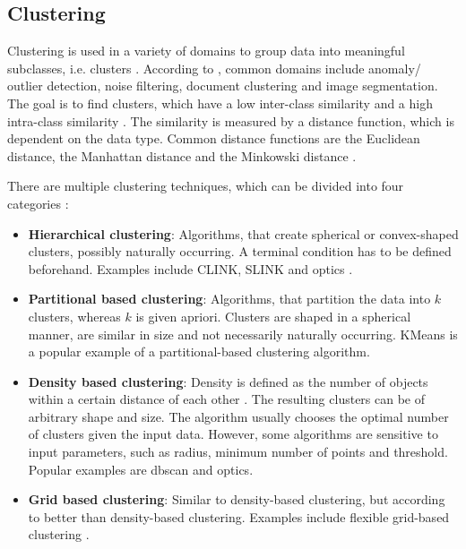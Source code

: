 \subsection{Clustering}\label{subsec:clustering}

Clustering is used in a variety of domains to group data into meaningful subclasses, i.e. clusters \cite{OPTICS2013, OPTICS2014, OPTICS_kMeans_2016}.
According to \citeauthor{OPTICS2013}, common domains include anomaly/ outlier detection, noise filtering, document clustering and image segmentation. 
The goal is to find clusters, which have a low inter-class similarity and a high intra-class similarity \cite{OPTICS2013}.
The similarity is measured by a distance function, which is dependent on the data type. 
Common distance functions are the Euclidean distance, the Manhattan distance and the Minkowski distance \cite{OPTICS_kMeans_2016}.

There are multiple clustering techniques, which can be divided into four categories \cite{OPTICS2016}: 
\begin{itemize}
    \item \textbf{Hierarchical clustering}:
    Algorithms, that create spherical or convex-shaped clusters, possibly naturally occurring. 
    A terminal condition has to be defined beforehand.
    Examples include CLINK, SLINK \cite{OPTICS2014} and \ac{optics} \cite{OPTICS2013}.

    \item \textbf{Partitional based clustering}: 
    Algorithms, that partition the data into $k$ clusters, whereas $k$ is given apriori.
    Clusters are shaped in a spherical manner, are similar in size and not necessarily naturally occurring.
    KMeans is a popular example of a partitional-based clustering algorithm.

    \item \textbf{Density based clustering}:
    Density is defined as the number of objects within a certain distance of each other \cite{OPTICS_kMeans_2016}.
    The resulting clusters can be of arbitrary shape and size.
    The algorithm usually chooses the optimal number of clusters given the input data.
    However, some algorithms are sensitive to input parameters, such as radius, minimum number of points and threshold.
    Popular examples are \ac{dbscan} and \ac{optics}.
    
    \item \textbf{Grid based clustering}:
    Similar to density-based clustering, but according to \citeauthor{OPTICS2016} better than density-based clustering.
    Examples include flexible grid-based clustering \cite{OPTICS2014}.
    
\end{itemize}

